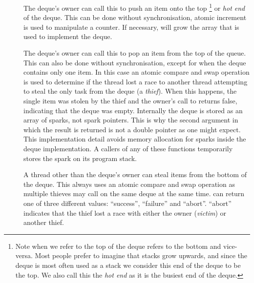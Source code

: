 \begin{description}

    \item[]
    The deque's owner can call this to push an item onto the
    top%
\footnote{
        Note when we refer to the top of the deque
        \citet{Chase_2005_wsdeque} refers to the bottom and vice-versa.
        Most people prefer to imagine that stacks grow upwards,
        and since the deque is most often used as a stack we consider this
        end of the deque to be the top.
        We also call this the \emph{hot end} as it is the busiest end of the
        deque.}
    or \emph{hot end} of the deque.
    This can be done without synchronisation,
    atomic increment is used to manipulate a counter.
    If necessary,
    \push will grow the array that is used to implement the
    deque.

    \item[]
    The deque's owner can call this to pop an item from the top of the
    queue.
    This can also be done without synchronisation,
    except for when the deque contains only one item.
    In this case an atomic compare and swap operation is used to
    determine if the thread lost a race to another thread attempting to
    steal the only task from the deque (a \emph{thief}).
    When this happens, the single item was stolen by the thief and the
    owner's call to \pop returns false,
    indicating that the deque was empty.
    Internally the deque is stored as an array of sparks, not spark
    pointers.
    This is why the second argument in which the result is returned is not a
    double pointer as one might expect.
    This implementation detail avoids memory allocation for sparks inside
    the deque implementation.
    A callers of any of these functions temporarily stores the spark on 
    its program stack.

    \item[]
    A thread other than the deque's owner can steal
    items from the bottom of the deque.
    This always uses an atomic compare and swap operation as multiple
    thieves may call \steal on the same deque at the same time.
    \steal can return one of three different values:
    ``success'', ``failure'' and ``abort''.
    ``abort'' indicates that the thief lost a race with either the owner
    (\emph{victim}) or another thief.

\end{description}

